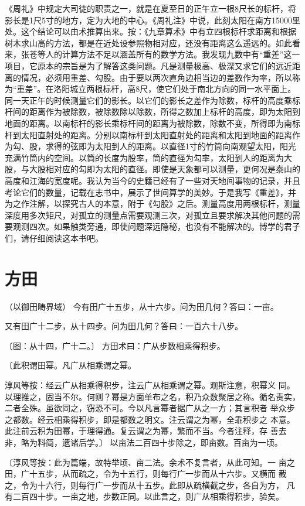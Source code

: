 \documentclass[a4paper,12pt,UTF8,twoside]{ctexbook}
\begin{document}
《周礼》中规定大司徒的职责之一，就是在夏至日的正午立一根8尺长的标杆，将影长是1尺5寸的地方，定为大地的中心。《周礼注》中说，此刻太阳在南方15000里处。这个结论可以由术推算出来。按：《九章算术》中有立四根标杆求距离和根据树木求山高的方法，都是在近处设参照物相对应，还没有距离这么遥远的。如此看来，张苍等人的计算方法不足以涵盖所有的数学方法。我发现九数中有“重差”这一项目，它原本的宗旨是为了解答这类问题。凡是测量极高、极深又求它们的远近距离的情况，必须用重差、勾股。由于要以两次直角边相当边的差数作为率，所以称为“重差”。在洛阳城立两根标杆，高8尺，使它们处于南北方向的同一水平面上。同一天正午的时候测量它们的影长。以它们的影长之差作为除数，标杆的高度乘标杆间的距离作为被除数，被除数除以除数，所得之数加上标杆的高度，即为太阳到地面的距离。以南标杆的影长乘标杆间的距离为被除数，除数不变，所得即为南标杆到太阳直射处的距离。分别以南标杆到太阳直射处的距离和太阳到地面的距离作为勾、股，求得的弦即为太阳到人的距离。以直径1寸的竹筒向南观望太阳，阳光充满竹筒内的空间。以筒的长度为股率，筒的直径为勾率，太阳到人的距离为大股，与大股相对应的勾即为太阳的直径。即使是天象都可以测量，更何况是泰山的高度和江海的宽度呢。我认为当今的史籍已经有了一些对天地间事物的记录，并且考论它们的数量，记载在志书中，展示了世间算学的美妙。于是我写《重差》，并为之作注解，以探究古人的本意，附于《勾股》之后。测量高度用两根标杆，测量深度用多次矩尺，对孤立的测量点需要观测三次，对孤立且要求解决其他问题的需要观测四次。如果触类旁通，即使问题深远隐秘，也没有不能解决的。博学的君子们，请仔细阅读这本书吧。

\mainmatter
\chapter{方田}

（以御田畴界域） 今有田广十五步，从十六步。问为田几何？答曰：一亩。

又有田广十二步，从十四步。问为田几何？答曰：一百六十八步。

〔图：从十四，广十二。〕 方田术曰：广从步数相乘得积步。

〔此积谓田幂。凡广从相乘谓之幂。

淳风等按：经云广从相乘得积步，注云广从相乘谓之幂。观斯注意，积幂义 同。以理推之，固当不尔。何则？幂是方面单布之名，积乃众数聚居之称。循名责实，二者全殊。虽欲同之，窃恐不可。今以凡言幂者据广从之一方；其言积者 举众步之都数。经云相乘得积步，即是都数之明文。注云谓之为幂，全乖积步之 本意。此注前云积为田幂，于理得通。复云谓之为幂，繁而不当。今者注释，存 善去非，略为料简，遗诸后学。〕 以亩法二百四十步除之，即亩数。百亩为一顷。

〔淳风等按：此为篇端，故特举顷、亩二法。余术不复言者，从此可知。一 亩之田，广十五步，从而疏之，令为十五行，则每行广一步而从十六步。又横而 截之，令为十六行，则每行广一步而从十五步。此即从疏横截之步，各自为方， 凡有二百四十步。一亩之地，步数正同。以此言之，则广从相乘得积步，验矣。
\end{document}
